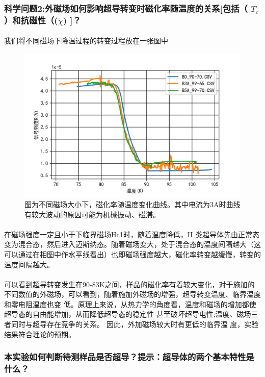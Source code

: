 \documentclass{ctexart}
\theoremstyle{ansstyle}
\begin{document}
\subsubsection{科学问题2:外磁场如何影响超导转变时磁化率随温度的关系[包括（ $T_{c}$）和抗磁性（($\tilde{\chi}$) ]？}
\paragraph{}我们将不同磁场下降温过程的转变过程放在一张图中
\begin{figure}[H]
    \centering
    \includegraphics[width=1.\linewidth]{./png/10.png}
    \caption{图为不同磁场大小下，磁化率随温度变化曲线。其中电流为3A时曲线有较大波动的原因可能为机械振动、磁滞。}
\end{figure}
\paragraph{}在磁场强度一定且小于下临界磁场Hc1时，随着温度降低，II 类超导体先由正常态变为混合态，然后进入迈斯纳态。随着磁场变大，处于混合态的温度间隔越大（这可以通过在相图中作水平线看出）也即磁场强度越大，磁化率转变越缓慢，转变的温度间隔越大。
\paragraph{}可以看到超导转变发生在90-83K之间，样品的磁化率有着较大变化，对于施加的不同数值的外磁场，可以看到，随着施加外磁场的增强，超导转变温度、临界温度和零电阻温度也变
低。原理上来说，从热力学的角度看，温度和磁场的增加都使超导态的自由能增加，从而降低超导态的稳定性
甚至破坏超导电性;温度、磁场三者同时与超导存在竞争的关系。 因此，外加磁场较大时有更低的临界温
度，实验结果符合理论的预期。
\subsubsection{本实验如何判断待测样品是否超导？提示：超导体的两个基本特性是
    什么？}
\end{document}
